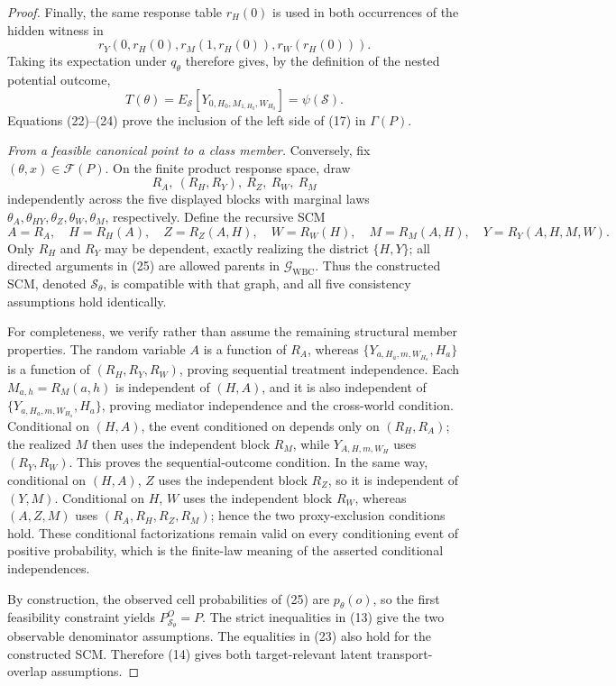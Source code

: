 \documentclass{article}
\begin{document}
\begin{proof}
Finally, the same response table \(r_H(0)\) is used in both occurrences of
the hidden witness in
\[
 r_Y\!\left(0,r_H(0),r_M(1,r_H(0)),r_W(r_H(0))\right).
\]
Taking its expectation under \(q_\theta\) therefore gives, by the definition
of the nested potential outcome,
\[
 T(\theta)=E_{\mathcal S}
 [Y_{0,H_0,M_{1,H_0},W_{H_0}}]=\psi(\mathcal S).
 \tag{24}
\]
Equations (22)--(24) prove the inclusion of the left side of (17) in
\(\Gamma(P)\).

\emph{From a feasible canonical point to a class member.}
Conversely, fix \((\theta,x)\in\mathcal F(P)\).  On the finite product
response space, draw
\[
 R_A,\ (R_H,R_Y),\ R_Z,\ R_W,\ R_M
\]
independently across the five displayed blocks with marginal laws
\(\theta_A,\theta_{HY},\theta_Z,\theta_W,\theta_M\), respectively.  Define
the recursive SCM
\[
 A=R_A,\quad H=R_H(A),\quad Z=R_Z(A,H),\quad W=R_W(H),\quad
 M=R_M(A,H),\quad Y=R_Y(A,H,M,W).
 \tag{25}
\]
Only \(R_H\) and \(R_Y\) may be dependent, exactly realizing the district
\(\{H,Y\}\); all directed arguments in (25) are allowed parents in
\(\mathcal G_{\mathrm{WBC}}\).  Thus the constructed SCM, denoted
\(\mathcal S_\theta\), is compatible with that graph, and all five
consistency assumptions hold identically.

For completeness, we verify rather than assume the remaining structural
member properties.  The random variable \(A\) is a function of \(R_A\),
whereas \(\{Y_{a,H_a,m,W_{H_a}},H_a\}\) is a function of
\((R_H,R_Y,R_W)\), proving sequential treatment independence.  Each
\(M_{a,h}=R_M(a,h)\) is independent of \((H,A)\), and it is also independent
of \(\{Y_{a,H_a,m,W_{H_a}},H_a\}\), proving mediator independence and the
cross-world condition.  Conditional on \((H,A)\), the event conditioned on
depends only on \((R_H,R_A)\); the realized \(M\) then uses the independent
block \(R_M\), while \(Y_{A,H,m,W_H}\) uses \((R_Y,R_W)\).  This proves
the sequential-outcome condition.  In the same way, conditional on
\((H,A)\), \(Z\) uses the independent block \(R_Z\), so it is independent
of \((Y,M)\).  Conditional on \(H\), \(W\) uses the independent block
\(R_W\), whereas \((A,Z,M)\) uses \((R_A,R_H,R_Z,R_M)\); hence the two
proxy-exclusion conditions hold.  These conditional factorizations remain
valid on every conditioning event of positive probability, which is the
finite-law meaning of the asserted conditional independences.

By construction, the observed cell probabilities of (25) are
\(p_\theta(o)\), so the first feasibility constraint yields
\(P_{\mathcal S_\theta}^O=P\).  The strict inequalities in (13) give the two
observable denominator assumptions.  The equalities in (23) also hold for
the constructed SCM.  Therefore (14) gives both target-relevant latent
transport-overlap assumptions.


\end{proof}
\end{document}
